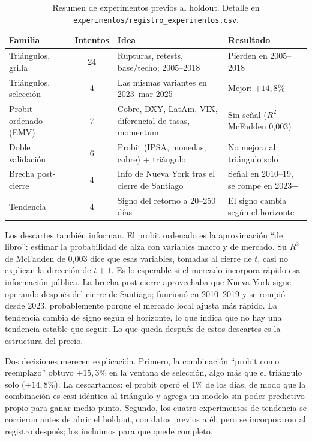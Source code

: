 \documentclass[10pt,a4paper]{article}
\begin{document}
\begin{table}[htbp]\centering\small
\begin{tabularx}{\textwidth}{@{}lcXl@{}}
\toprule
Familia & Intentos & Idea & Resultado \\
\midrule
Triángulos, grilla & 24 & Rupturas, retests, base/techo; 2005--2018 & Pierden en 2005--2018 \\
Triángulos, selección & 4 & Las mismas variantes en 2023--mar 2025 & Mejor: $+14{,}8\%$ \\
Probit ordenado (EMV) & 7 & Cobre, DXY, LatAm, VIX, diferencial de tasas, momentum & Sin señal ($R^2$ McFadden 0{,}003) \\
Doble validación & 6 & Probit (IPSA, monedas, cobre) + triángulo & No mejora al triángulo solo \\
Brecha post-cierre & 4 & Info de Nueva York tras el cierre de Santiago & Señal en 2010--19, se rompe en 2023+ \\
Tendencia & 4 & Signo del retorno a 20--250 días & El signo cambia según el horizonte \\
\bottomrule
\end{tabularx}
\caption{Resumen de experimentos previos al holdout. Detalle en
\texttt{experimentos/registro\_experimentos.csv}.}\label{tab:descartados}
\end{table}

Los descartes también informan. El probit ordenado es la aproximación ``de libro'':
estimar la probabilidad de alza con variables macro y de mercado. Su $R^2$ de
McFadden de 0,003 dice que esas variables, tomadas al cierre de $t$, casi no
explican la dirección de $t+1$. Es lo esperable si el mercado incorpora rápido esa
información pública. La brecha post-cierre aprovechaba que Nueva York sigue
operando después del cierre de Santiago; funcionó en 2010--2019 y se rompió desde
2023, probablemente porque el mercado local ajusta más rápido. La tendencia cambia
de signo según el horizonte, lo que indica que no hay una tendencia estable que
seguir. Lo que queda después de estos descartes es la estructura del precio.

Dos decisiones merecen explicación. Primero, la combinación ``probit como
reemplazo'' obtuvo $+15{,}3\%$ en la ventana de selección, algo más que el
triángulo solo ($+14{,}8\%$). La descartamos: el probit operó el 1\% de los días,
de modo que la combinación es casi idéntica al triángulo y agrega un modelo sin
poder predictivo propio para ganar medio punto. Segundo, los cuatro experimentos de
tendencia se corrieron antes de abrir el holdout, con datos previos a él, pero se
incorporaron al registro después; los incluimos para que quede completo.
\end{document}
